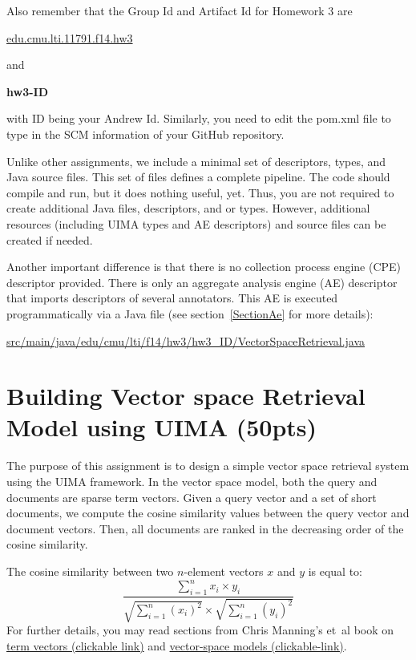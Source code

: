 \documentclass[oneside,11pt]{memoir}
\begin{document}
Also remember that the Group Id and Artifact Id for Homework 3 are

\begin{center}
\url{edu.cmu.lti.11791.f14.hw3}
\end{center}

and 

\begin{center}\textbf{hw3-ID }\end{center}
with ID being your Andrew Id.
Similarly, you need to edit the pom.xml file to type in the SCM information of
your GitHub repository. 

Unlike other assignments, 
we include a minimal set of descriptors, types, and Java source files.
This set of files defines a complete pipeline. 
The code should compile and run, but it does nothing useful, yet.
Thus, you are not required
to create additional Java files, descriptors, and or types.
However, additional resources (including UIMA types 
and AE descriptors) and source files can be created if needed.

Another important difference is that there is no collection process engine (CPE) descriptor provided.
There is only an aggregate analysis engine (AE) descriptor that imports descriptors of several annotators.
This AE is executed programmatically via a Java file (see section~\ref{SectionAe} for more details):

\begin{center}\url{src/main/java/edu/cmu/lti/f14/hw3/hw3_ID/VectorSpaceRetrieval.java} \end{center}

\chapter{Building Vector space Retrieval Model using UIMA (50pts)}
\label{SectionBuildVS}

The purpose of this assignment is to design a simple vector space retrieval system using the UIMA
framework. 
In the vector space model,
both the query and documents are sparse term vectors.
Given a query vector and a set of short documents, 
we compute the cosine similarity values between the query vector and document vectors.
Then, all documents are ranked in the decreasing order of the cosine similarity.

The cosine  similarity between two \mbox{$n$-element} vectors $x$ and $y$ is equal to:
$$
\frac{ \sum\limits_{i=1}^{n}{x_i \times y_i} }{ \sqrt{\sum\limits_{i=1}^{n}{(x_i)^2}} \times \sqrt{\sum\limits_{i=1}^{n}{(y_i)^2}} }
$$
For further details, you may read
sections from Chris Manning's et~al book on \href{http://nlp.stanford.edu/IR-book/html/htmledition/term-frequency-and-weighting-1.html#sec:secbagofwords}{term vectors (clickable link)} and \href{http://nlp.stanford.edu/IR-book/html/htmledition/the-vector-space-model-for-scoring-1.html}{vector-space models (clickable-link)}.
\end{document}
